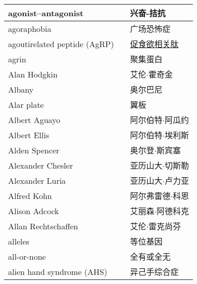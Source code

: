 \begin{longtable}{lll}
	\midrule
	agonist–antagonist     &&  兴奋-拮抗  \\
	
	\midrule
	agoraphobia     &&  广场恐怖症  \\
	
	\midrule
	agoutirelated peptide (AgRP)    &&  \href{https://baike.baidu.com/item/AGRP/1308711}{促食欲相关肽}  \\
	
	\midrule
	agrin     &&  聚集蛋白  \\
	
	\midrule
	Alan Hodgkin    &&  艾伦$\cdot$霍奇金  \\
	
	\midrule
	Albany   &&  奥尔巴尼  \\
	
	\midrule
	Alar plate     &&  翼板  \\
	
	\midrule
	Albert Aguayo     &&  阿尔伯特$\cdot$阿瓜约  \\
	
	\midrule
	Albert Ellis     &&  阿尔伯特$\cdot$埃利斯  \\
	
	\midrule
	Alden Spencer     &&  奥尔登$\cdot$斯宾塞  \\
	
	\midrule
	Alexander Chesler     &&  亚历山大$\cdot$切斯勒  \\
	
	\midrule
	Alexander Luria     &&  亚历山大$\cdot$卢力亚  \\
	
	\midrule
	Alfred Kohn     &&  阿尔弗雷德$\cdot$科恩  \\
	
	\midrule
	Alison Adcock     &&  艾丽森$\cdot$阿德科克  \\
	
	\midrule
	Allan Rechtschaffen     &&  艾伦$\cdot$雷克尚芬  \\
	
	\midrule
	alleles     &&  等位基因  \\
	
	\midrule
	all-or-none     &&  全有或全无  \\
	
	\midrule
	alien hand syndrome (AHS)     &&  异己手综合症  \\
	

\end{longtable}
